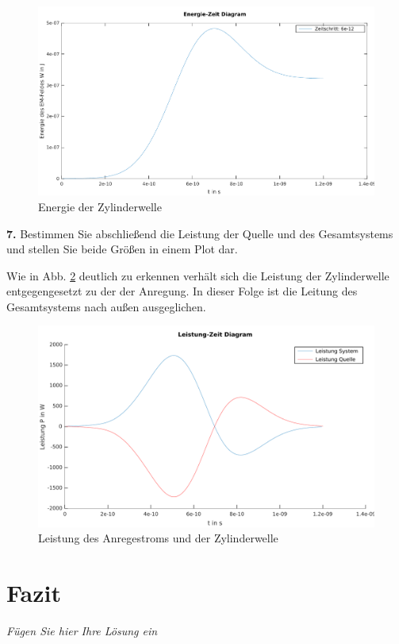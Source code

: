 \documentclass[Protokollheft.tex]{subfiles}
\begin{document}
\begin{figure}
	\centering
	\includegraphics[width=0.7\linewidth]{EnegiedesFeldes}
	\caption{Energie der Zylinderwelle}
	\label{fig:enegiedesfeldes}
\end{figure}




\begin{framed}
	\noindent \textbf{7.} Bestimmen Sie abschließend die Leistung der Quelle und des Gesamtsystems und stellen Sie beide Größen in einem Plot dar.\label{exer:powerPlot}
\end{framed}


 Wie in Abb. \ref{fig:leistung} deutlich zu erkennen verhält sich die Leistung der Zylinderwelle entgegengesetzt zu der der Anregung. In dieser Folge ist die Leitung des Gesamtsystems nach außen ausgeglichen. 
\begin{figure}
	\centering
	\includegraphics[width=0.7\linewidth]{Leistung}
	\caption{Leistung des Anregestroms und der Zylinderwelle}
	\label{fig:leistung}
\end{figure}





\section{Fazit}
\emph{Fügen Sie hier Ihre Lösung ein}
\end{document}
